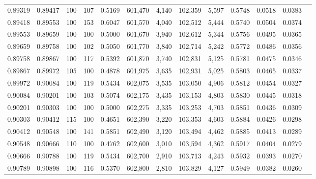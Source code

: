\begin{tabular}{rrrrrrrrrrrrr}
0.89319 & 0.89417 &   100 & 107 &                                     0.5169 & 601,470 &   4,140 & 102,359 &   5,597 & 0.5748 & 0.0518 & 0.0383 \\
0.89418 & 0.89553 &   100 & 153 &                                     0.6047 & 601,570 &   4,040 & 102,512 &   5,444 & 0.5740 & 0.0504 & 0.0374 \\
0.89553 & 0.89659 &   100 & 100 &                                     0.5000 & 601,670 &   3,940 & 102,612 &   5,344 & 0.5756 & 0.0495 & 0.0365 \\
0.89659 & 0.89758 &   100 & 102 &                                     0.5050 & 601,770 &   3,840 & 102,714 &   5,242 & 0.5772 & 0.0486 & 0.0356 \\
0.89758 & 0.89867 &   100 & 117 &                                     0.5392 & 601,870 &   3,740 & 102,831 &   5,125 & 0.5781 & 0.0475 & 0.0346 \\
0.89867 & 0.89972 &   105 & 100 &                                     0.4878 & 601,975 &   3,635 & 102,931 &   5,025 & 0.5803 & 0.0465 & 0.0337 \\
0.89972 & 0.90084 &   100 & 119 &                                     0.5434 & 602,075 &   3,535 & 103,050 &   4,906 & 0.5812 & 0.0454 & 0.0327 \\
0.90084 & 0.90201 &   100 & 103 &                                     0.5074 & 602,175 &   3,435 & 103,153 &   4,803 & 0.5830 & 0.0445 & 0.0318 \\
0.90201 & 0.90303 &   100 & 100 &                                     0.5000 & 602,275 &   3,335 & 103,253 &   4,703 & 0.5851 & 0.0436 & 0.0309 \\
0.90303 & 0.90412 &   115 & 100 &                                     0.4651 & 602,390 &   3,220 & 103,353 &   4,603 & 0.5884 & 0.0426 & 0.0298 \\
0.90412 & 0.90548 &   100 & 141 &                                     0.5851 & 602,490 &   3,120 & 103,494 &   4,462 & 0.5885 & 0.0413 & 0.0289 \\
0.90548 & 0.90666 &   110 & 100 &                                     0.4762 & 602,600 &   3,010 & 103,594 &   4,362 & 0.5917 & 0.0404 & 0.0279 \\
0.90666 & 0.90788 &   100 & 119 &                                     0.5434 & 602,700 &   2,910 & 103,713 &   4,243 & 0.5932 & 0.0393 & 0.0270 \\
0.90789 & 0.90898 &   100 & 116 &                                     0.5370 & 602,800 &   2,810 & 103,829 &   4,127 & 0.5949 & 0.0382 & 0.0260 \\

\end{tabular}
